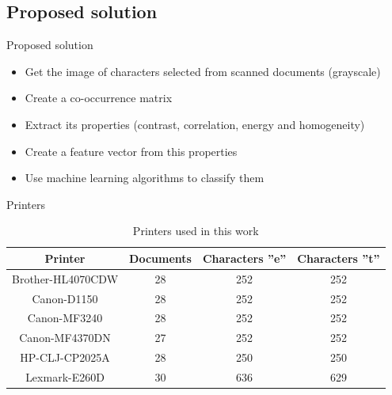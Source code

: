 \documentclass[notes]{beamer}
\begin{document}
\begin{frame}
\section{Proposed solution}
\begin{block}{Proposed solution}

\begin{itemize}

\item Get the image of characters selected from scanned documents (grayscale)

\item Create a co-occurrence matrix

\item Extract its properties (contrast, correlation, energy and homogeneity)

\item Create a feature vector from this properties

\item Use machine learning algorithms to classify them

\end{itemize}

\end{block}

\end{frame}

\begin{frame}

\begin{block}{Printers}

\begin{table}
\caption{Printers used in this work}
\label{tab:printers}
\begin{small}
\begin{center}
\begin{tabular}{ | c | c | c | c |}
\hline
Printer & Documents & Characters ''e'' & Characters ''t'' \\ \hline
Brother-HL4070CDW & 28 & 252 & 252\\
Canon-D1150 & 28 & 252 & 252\\
Canon-MF3240 & 28 & 252 & 252\\
Canon-MF4370DN & 27 & 252 & 252 \\
HP-CLJ-CP2025A & 28 & 250 & 250\\
Lexmark-E260D & 30 & 636 & 629\\
\hline
\end{tabular}
\end{center}   
\end{small} 
\end{table}

\end{block}

\end{frame}
\end{document}
